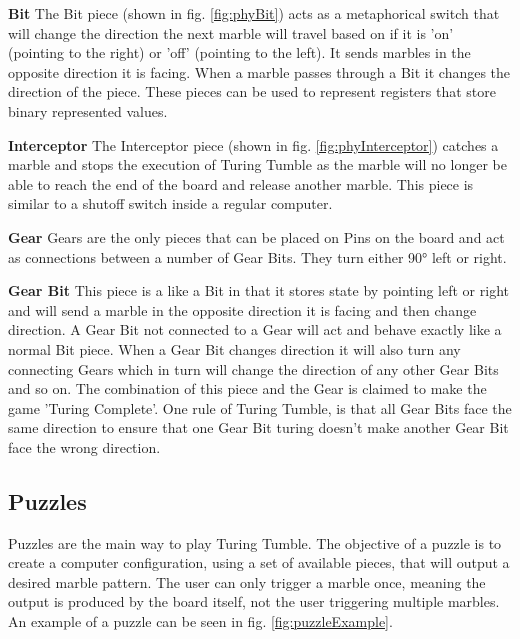 \documentclass{l4proj}
\begin{document}
\textbf{Bit}
The Bit piece (shown in fig. \ref{fig:phyBit}) acts as a metaphorical switch that will change the direction the next marble will travel based on if it is 'on' (pointing to the right) or 'off' (pointing to the left). It sends marbles in the opposite direction it is facing. When a marble passes through a Bit it changes the direction of the piece. These pieces can be used to represent registers that store binary represented values.

\textbf{Interceptor}
The Interceptor piece (shown in fig. \ref{fig:phyInterceptor}) catches a marble and stops the execution of Turing Tumble as the marble will no longer be able to reach the end of the board and release another marble. This piece is similar to a shutoff switch inside a regular computer. 

\textbf{Gear}
Gears are the only pieces that can be placed on Pins on the board and act as connections between a number of Gear Bits. They turn either 90° left or right. 

\textbf{Gear Bit}
This piece is a like a Bit in that it stores state by pointing left or right and will send a marble in the opposite direction it is facing and then change direction. A Gear Bit not connected to a Gear will act and behave exactly like a normal Bit piece. When a Gear Bit changes direction it will also turn any connecting Gears which in turn will change the direction of any other Gear Bits and so on. The combination of this piece and the Gear is claimed to make the game 'Turing Complete'. One rule of Turing Tumble, is that all Gear Bits face the same direction to ensure that one Gear Bit turing doesn't make another Gear Bit face the wrong direction.


\subsection{Puzzles}
\label{section:puzzle-background}
Puzzles are the main way to play Turing Tumble. The objective of a puzzle is to create a computer configuration, using a set of available pieces, that will output a desired marble pattern. The user can only trigger a marble once, meaning the output is produced by the board itself, not the user triggering multiple marbles. An example of a puzzle can be seen in fig. \ref{fig:puzzleExample}.  
\end{document}
